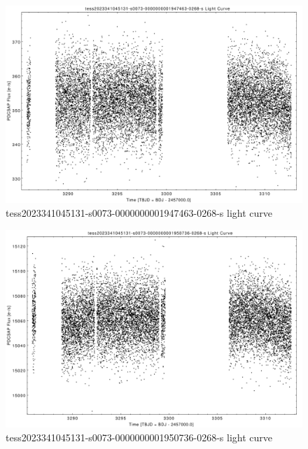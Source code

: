 \documentclass[a4paper,12pt]{article}
\begin{document}
\begin{figure}[htbp]
    \centering
    \includegraphics[width = 1\textwidth]{
      lightcurves/tess2023341045131-s0073-0000000001947463-0268-s.pdf}
    \caption{tess2023341045131-s0073-0000000001947463-0268-s light curve}
\end{figure}
\begin{figure}[htbp]
    \centering
    \includegraphics[width = 1\textwidth]{
      lightcurves/tess2023341045131-s0073-0000000001950736-0268-s.pdf}
    \caption{tess2023341045131-s0073-0000000001950736-0268-s light curve}
\end{figure}
\end{document}
